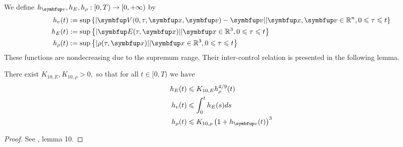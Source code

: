 \begin{definition}
    We define $h_{\vv}, h_{E}, h_{\rho}:[0, T)\rightarrow [0,+\infty)$ by 
\[
\begin{aligned}
h_{v}(t) &:=\sup \left\{|\vect{V}(0, \tau, \vx, \vv)-\vv| | \vx, \vv \in \bbR^{n}, 0 \leqslant \tau \leqslant t\right\} \\
h_{E}(t) &:=\sup \left\{|\vE(\tau, \vx)| | \vx \in \bbR^{3}, 0 \leqslant \tau \leqslant t\right\} \\
h_{\rho}(t) &:=\sup \left\{|\rho(\tau, \vx)| | \vx \in \bbR^{3}, 0 \leqslant \tau \leqslant t\right\}
\end{aligned}
\]
These functions are nondecreasing due to the supremum range. Their inter-control relation is presented in the following lemma. 
\end{definition}

\begin{lemma}
    There exist $K_{10, E}, K_{10, \rho}>0,$ so that for all $t \in[0, T) \text { we have }$
\[
\begin{aligned}
h_{E}(t) & \leqslant K_{10, E} h_{\rho}^{4 / 9}(t) \\
h_{v}(t) & \leqslant \int_{0}^{t} h_{E}(s) d s \\
h_{\rho}(t) & \leqslant K_{10, \rho}\left(1+h_{\vv}(t)\right)^{3}
\end{aligned}
\]
\end{lemma}

\begin{proof}
  See \cite{pfaffelmoser_global_1992}, lemma 10.
\end{proof}




